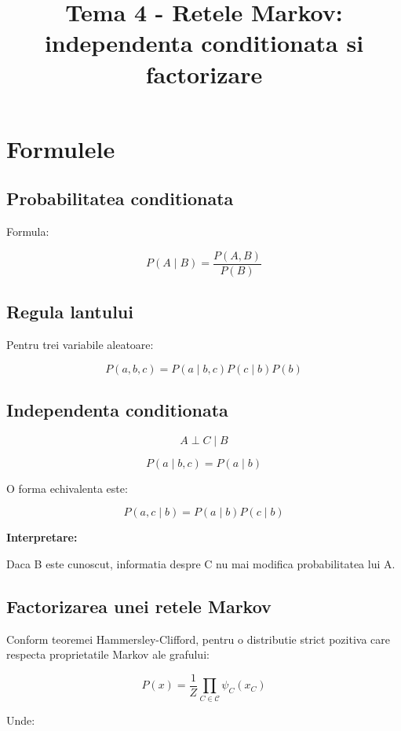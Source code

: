 \documentclass[12pt,a4paper]{article}
\title{\textbf{Tema 4 - Retele Markov: independenta conditionata si factorizare}}
\author{}
\date{}
\begin{document}
\maketitle

\section{Formulele}

\subsection{Probabilitatea conditionata}

Formula:

\[
\boxed{
P(A\mid B)=\frac{P(A,B)}{P(B)}
}
\]

\subsection{Regula lantului}

Pentru trei variabile aleatoare:

\[
\boxed{
P(a,b,c)=P(a\mid b,c)P(c\mid b)P(b)
}
\]

\subsection{Independenta conditionata}

\[
\boxed{A\perp C\mid B}
\]

\[
\boxed{
P(a\mid b,c)=P(a\mid b)
}
\]

O forma echivalenta este:

\[
\boxed{
P(a,c\mid b)=P(a\mid b)P(c\mid b)
}
\]

\textbf{Interpretare:}

Daca B este cunoscut, informatia despre C nu mai modifica probabilitatea lui A.

\subsection{Factorizarea unei retele Markov}

Conform teoremei Hammersley-Clifford, pentru o distributie strict pozitiva care respecta proprietatile Markov ale grafului:

\[
\boxed{
P(x)=\frac{1}{Z}
\prod_{C\in\mathcal{C}}\psi_C(x_C)
}
\]

Unde:
\end{document}
